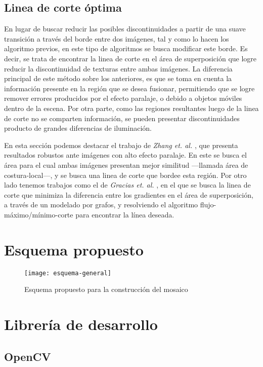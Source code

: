 \subsection*{Linea de corte óptima}

En lugar de buscar reducir las posibles discontinuidades a partir de una suave transición a través del borde entre dos imágenes, tal y como lo hacen los algoritmo previos, en este tipo de algoritmos se busca modificar este borde. Es decir, se trata de encontrar la linea de corte en el área de superposición que logre reducir la discontinuidad de texturas entre ambas imágenes. La diferencia principal de este método sobre los anteriores, es que se toma en cuenta la información presente en la región que se desea fusionar, permitiendo que se logre remover errores producidos por el efecto paralaje, o debido a objetos móviles dentro de la escena. Por otra parte, como las regiones resultantes luego de la linea de corte no se comparten información, se pueden presentar discontinuidades producto de grandes diferencias de iluminación.

En esta sección podemos destacar el trabajo de \textit{Zhang et. al.} \cite{zhang}, que presenta resultados robustos ante imágenes con alto efecto paralaje. En este se busca el área para el cual ambas imágenes presentan mejor similitud ---llamada área de costura-local---, y se busca una linea de corte que bordee esta región. Por otro lado tenemos trabajos como el de \textit{Gracias et. al.} \cite{watershed}, en el que se busca la linea de corte que minimiza la diferencia entre los gradientes en el área de superposición, a través de un modelado por grafos, y resolviendo el algoritmo flujo-máximo/mínimo-corte \cite{maxflow} para encontrar la línea deseada.


\section{Esquema propuesto}

\begin{figure}[H]
	\centerline{
		\texttt{[image: esquema-general]}}
		\caption{Esquema propuesto para la construcción del mosaico}
	
	\label{imagen:esquema}
\end{figure}

\section{Librería de desarrollo}

\subsection{OpenCV}